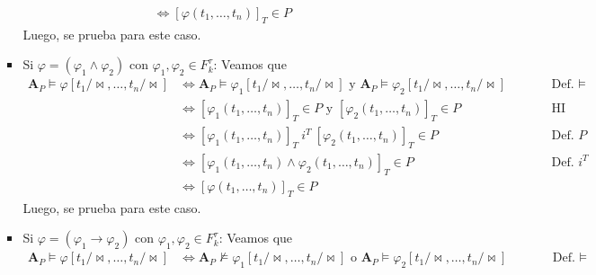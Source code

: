 \documentclass{article}
\begin{document}
\begin{enumerate}
\begin{itemize}
\begin{itemize}
\begin{equation*}
\begin{alignedat}{2}
                                                                                         & \iff [\varphi(t_1,\dots,t_n)]_T\in P
                          \end{alignedat}
                        \end{equation*}
                        Luego, se prueba para este caso.
                  \item Si $\varphi=(\varphi_1\land\varphi_2)$ con $\varphi_1,\varphi_2\in F^\tau_k$: Veamos que
                        \begin{equation*}
                          \begin{alignedat}{2}
                            \mathbf{A}_P\vDash\varphi[t_1/\!\bowtie,\dots,t_n/\!\bowtie] & \iff \mathbf{A}_P\vDash\varphi_1[t_1/\!\bowtie,\dots,t_n/\!\bowtie]\text{ y } \mathbf{A}_P\vDash\varphi_2[t_1/\!\bowtie,\dots,t_n/\!\bowtie] &  & \qquad\text{Def. }\vDash \\
                                                                                         & \iff [\varphi_1(t_1,\dots,t_n)]_T\in P\text{ y }[\varphi_2(t_1,\dots,t_n)]_T\in P                                                            &  & \qquad\text{HI}          \\
                                                                                         & \iff [\varphi_1(t_1,\dots,t_n)]_T\ i^T\ [\varphi_2(t_1,\dots,t_n)]_T\in P                                                                    &  & \qquad\text{Def. }P      \\
                                                                                         & \iff [\varphi_1(t_1,\dots,t_n)\land\varphi_2(t_1,\dots,t_n)]_T\in P                                                                          &  & \qquad\text{Def. }i^T    \\
                                                                                         & \iff [\varphi(t_1,\dots,t_n)]_T\in P
                          \end{alignedat}
                        \end{equation*}
                        Luego, se prueba para este caso.
                  \item Si $\varphi=(\varphi_1\to\varphi_2)$ con $\varphi_1,\varphi_2\in F^\tau_k$: Veamos que
                        \begin{equation*}
                          \begin{alignedat}{2}
                            \mathbf{A}_P\vDash\varphi[t_1/\!\bowtie,\dots,t_n/\!\bowtie] & \iff \mathbf{A}_P\nvDash\varphi_1[t_1/\!\bowtie,\dots,t_n/\!\bowtie]\text{ o } \mathbf{A}_P\vDash\varphi_2[t_1/\!\bowtie,\dots,t_n/\!\bowtie] &  & \qquad\text{Def. }\vDash           \\

\end{alignedat}
\end{equation*}
\end{itemize}
\end{itemize}
\end{enumerate}
\end{document}
